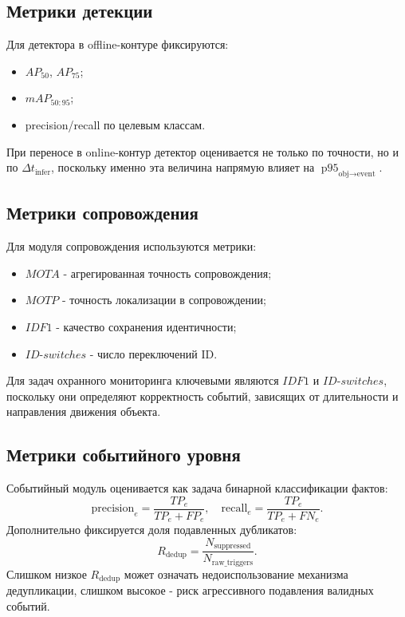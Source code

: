 \subsection{Метрики детекции}

Для детектора в offline-контуре фиксируются:
\begin{itemize}
    \item \(AP_{50}\), \(AP_{75}\);
    \item \(mAP_{50:95}\);
    \item precision/recall по целевым классам.
\end{itemize}

При переносе в online-контур детектор оценивается не только по точности, но и по \(\Delta t_{\text{infer}}\), поскольку именно эта величина напрямую влияет на \(\operatorname{p95}_{\text{obj}\to\text{event}}\).

\subsection{Метрики сопровождения}

Для модуля сопровождения используются метрики:
\begin{itemize}
    \item \(MOTA\) - агрегированная точность сопровождения;
    \item \(MOTP\) - точность локализации в сопровождении;
    \item \(IDF1\) - качество сохранения идентичности;
    \item \(ID\text{-}switches\) - число переключений ID.
\end{itemize}

Для задач охранного мониторинга ключевыми являются \(IDF1\) и \(ID\text{-}switches\), поскольку они определяют корректность событий, зависящих от длительности и направления движения объекта.

\subsection{Метрики событийного уровня}

Событийный модуль оценивается как задача бинарной классификации фактов:
\begin{equation}
\text{precision}_e = \frac{TP_e}{TP_e + FP_e}, \quad
\text{recall}_e = \frac{TP_e}{TP_e + FN_e}.
\end{equation}
Дополнительно фиксируется доля подавленных дубликатов:
\begin{equation}
R_{\text{dedup}} = \frac{N_{\text{suppressed}}}{N_{\text{raw\_triggers}}}.
\end{equation}
Слишком низкое \(R_{\text{dedup}}\) может означать недоиспользование механизма дедупликации, слишком высокое - риск агрессивного подавления валидных событий.

